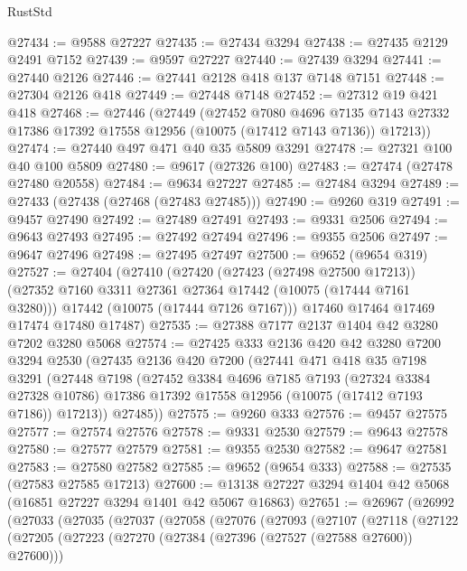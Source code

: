 \begin{lexlean}{RustStd}
\begin{coremodule}
@27434 := @9588 @27227
@27435 := @27434 @3294
@27438 := @27435 @2129 @2491 @7152
@27439 := @9597 @27227
@27440 := @27439 @3294
@27441 := @27440 @2126
@27446 := @27441 @2128 @418 @137 @7148 @7151
@27448 := @27304 @2126 @418
@27449 := @27448 @7148
@27452 := @27312 @19 @421 @418
@27468 := @27446
    (@27449
      (@27452
        @7080
        @4696
        @7135
        @7143
        @27332
        @17386
        @17392
        @17558
        @12956
        (@10075 (@17412 @7143 @7136))
        @17213))
@27474 := @27440 @497 @471 @40 @35 @5809 @3291
@27478 := @27321 @100 @40 @100 @5809
@27480 := @9617 (@27326 @100)
@27483 := @27474 (@27478 @27480 @20558)
@27484 := @9634 @27227
@27485 := @27484 @3294
@27489 := @27433 (@27438 (@27468 (@27483 @27485)))
@27490 := @9260 @319
@27491 := @9457 @27490
@27492 := @27489 @27491
@27493 := @9331 @2506
@27494 := @9643 @27493
@27495 := @27492 @27494
@27496 := @9355 @2506
@27497 := @9647 @27496
@27498 := @27495 @27497
@27500 := @9652 (@9654 @319)
@27527 := @27404
    (@27410
      (@27420
        (@27423 (@27498 @27500 @17213))
        (@27352 @7160 @3311 @27361 @27364 @17442 (@10075 (@17444 @7161 @3280)))
        @17442
        (@10075 (@17444 @7126 @7167)))
      @17460
      @17464
      @17469
      @17474
      @17480
      @17487)
@27535 := @27388 @7177 @2137 @1404 @42 @3280 @7202 @3280 @5068
@27574 := @27425
    @333
    @2136
    @420
    @42
    @3280
    @7200
    @3294
    @2530
    (@27435
      @2136
      @420
      @7200
      (@27441
        @471
        @418
        @35
        @7198
        @3291
        (@27448
          @7198
          (@27452
            @3384
            @4696
            @7185
            @7193
            (@27324 @3384 @27328 @10786)
            @17386
            @17392
            @17558
            @12956
            (@10075 (@17412 @7193 @7186))
            @17213))
        @27485))
@27575 := @9260 @333
@27576 := @9457 @27575
@27577 := @27574 @27576
@27578 := @9331 @2530
@27579 := @9643 @27578
@27580 := @27577 @27579
@27581 := @9355 @2530
@27582 := @9647 @27581
@27583 := @27580 @27582
@27585 := @9652 (@9654 @333)
@27588 := @27535 (@27583 @27585 @17213)
@27600 := @13138 @27227 @3294 @1404 @42 @5068 (@16851 @27227 @3294 @1401 @42 @5067 @16863)
@27651 := @26967
    (@26992
      (@27033
        (@27035
          (@27037
            (@27058
              (@27076
                (@27093
                  (@27107
                    (@27118
                      (@27122
                        (@27205
                          (@27223
                            (@27270 (@27384 (@27396 (@27527 (@27588 @27600)) @27600)))

\end{coremodule}
\end{lexlean}
